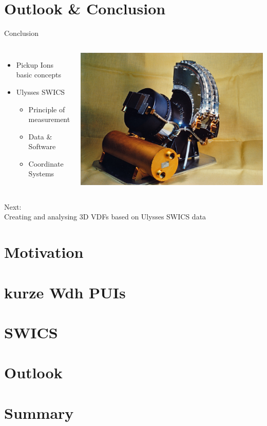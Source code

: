 \documentclass{beamer}
\begin{document}
\section{Outlook \& Conclusion}
\begin{frame}[plain]{Conclusion}
	\begin{columns}
		\column{5cm}
		\begin{itemize}
			\item Pickup Ions basic concepts
			\item Ulysses SWICS
			\begin{itemize}
				\item Principle of measurement
				\item Data \& Software
				\item Coordinate Systems
			\end{itemize}
		\end{itemize}


		\column{4cm}

		\includegraphics[scale=0.06]{Pics/ULYSSES-SWICS.jpg}

	\end{columns}
	\vspace{1cm}
		\hrulefill
	\vspace{0.5cm}

Next: \\
Creating and analysing 3D VDFs based on Ulysses SWICS data
\end{frame}
%
%
%
\section{Motivation}
\section{kurze Wdh PUIs}
\section{SWICS}

\section{Outlook}
\section{Summary}
%
%
%
\end{document}
